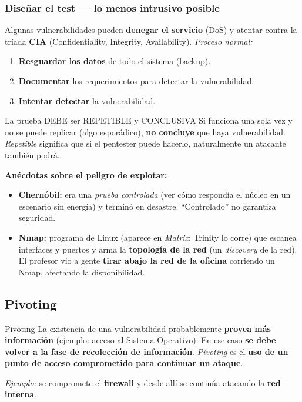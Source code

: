 \documentclass[11pt,a4paper]{article}
\begin{document}
\subsubsection*{Diseñar el test — lo menos intrusivo posible}
Algunas vulnerabilidades pueden \textbf{denegar el servicio} (DoS) y atentar contra la tríada
\textbf{CIA} (Confidentiality, Integrity, Availability). \emph{Proceso normal:}
\begin{enumerate}[leftmargin=1.8em,itemsep=2pt]
  \item \textbf{Resguardar los datos} de todo el sistema (backup).
  \item \textbf{Documentar} los requerimientos para detectar la vulnerabilidad.
  \item \textbf{Intentar detectar} la vulnerabilidad.
\end{enumerate}

\begin{warnbox}{La prueba DEBE ser REPETIBLE y CONCLUSIVA}
Si funciona una sola vez y no se puede replicar (algo esporádico), \textbf{no concluye} que
haya vulnerabilidad. \emph{Repetible} significa que si el pentester puede hacerlo,
naturalmente un atacante también podrá.

\textbf{Anécdotas sobre el peligro de explotar:}
\begin{itemize}[leftmargin=1.4em,itemsep=2pt]
  \item \textbf{Chernóbil:} era una \emph{prueba controlada} (ver cómo respondía el núcleo en
        un escenario sin energía) y terminó en desastre. ``Controlado'' no garantiza seguridad.
  \item \textbf{Nmap:} programa de Linux (aparece en \emph{Matrix}: Trinity lo corre) que
        escanea interfaces y puertos y arma la \textbf{topología de la red} (un \emph{discovery}
        de la red). El profesor vio a gente \textbf{tirar abajo la red de la oficina} corriendo
        un Nmap, afectando la disponibilidad.
\end{itemize}
\end{warnbox}

\subsection{Pivoting}

\begin{defbox}{Pivoting}
La existencia de una vulnerabilidad probablemente \textbf{provea más información} (ejemplo:
acceso al Sistema Operativo). En ese caso \textbf{se debe volver a la fase de recolección de
información}. \emph{Pivoting} es el \textbf{uso de un punto de acceso comprometido para
continuar un ataque}.

\emph{Ejemplo:} se compromete el \textbf{firewall} y desde allí se continúa atacando la
\textbf{red interna}.
\end{defbox}
\end{document}
